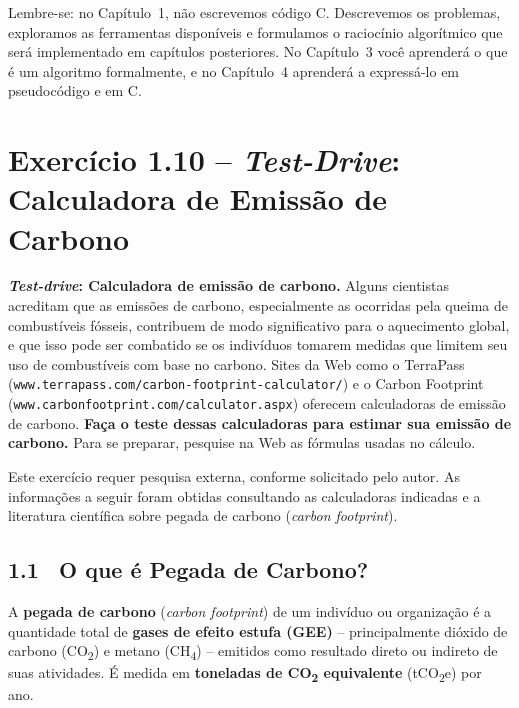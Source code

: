 \documentclass[12pt,a4paper]{article}
\begin{document}
\begin{atencao}
  Lembre-se: no Capítulo~1, não escrevemos código C. Descrevemos os problemas,
  exploramos as ferramentas disponíveis e formulamos o raciocínio algorítmico
  que será implementado em capítulos posteriores. No Capítulo~3 você aprenderá
  o que é um algoritmo formalmente, e no Capítulo~4 aprenderá a expressá-lo
  em pseudocódigo e em C.
\end{atencao}

\newpage
\tableofcontents
\newpage

\section{Exercício 1.10 -- \textit{Test-Drive}: Calculadora de Emissão de Carbono}

\begin{enunciadoBox}[Enunciado]
\textbf{\textit{Test-drive}: Calculadora de emissão de carbono.}
Alguns cientistas acreditam que as emissões de carbono, especialmente as ocorridas pela
queima de combustíveis fósseis, contribuem de modo significativo para o aquecimento global,
e que isso pode ser combatido se os indivíduos tomarem medidas que limitem seu uso de
combustíveis com base no carbono. Sites da Web como o TerraPass
(\texttt{www.terrapass.com/carbon-footprint-calculator/}) e o Carbon Footprint
(\texttt{www.carbonfootprint.com/calculator.aspx}) oferecem calculadoras de emissão de
carbono. \textbf{Faça o teste dessas calculadoras para estimar sua emissão de carbono.}
Para se preparar, pesquise na Web as fórmulas usadas no cálculo.
\end{enunciadoBox}

\bigskip

\begin{pesquisa}
Este exercício requer pesquisa externa, conforme solicitado pelo autor. As informações
a seguir foram obtidas consultando as calculadoras indicadas e a literatura científica
sobre pegada de carbono (\textit{carbon footprint}).
\end{pesquisa}

\bigskip

\subsection*{1.1 \ O que é Pegada de Carbono?}

A \textbf{pegada de carbono} (\textit{carbon footprint}) de um indivíduo ou organização
é a quantidade total de \textbf{gases de efeito estufa (GEE)} -- principalmente dióxido
de carbono (CO\textsubscript{2}) e metano (CH\textsubscript{4}) -- emitidos como resultado
direto ou indireto de suas atividades. É medida em \textbf{toneladas de CO\textsubscript{2}
equivalente} (tCO\textsubscript{2}e) por ano.
\end{document}
